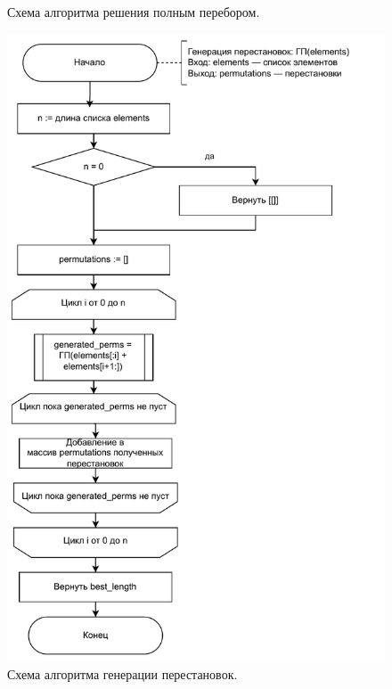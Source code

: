 \begin{figure}[H]
    \caption{Схема алгоритма решения полным перебором.}
    \label{images:full}
\end{figure}

\begin{figure}[H]
    \centering
    \includegraphics[width=130mm]{images/generate_perms}
    \caption{Схема алгоритма генерации перестановок.}
    \label{images:generate_perms}
\end{figure}


